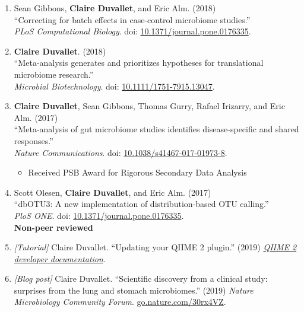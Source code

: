 \documentclass[10pt]{article}
\makeatletter
\newlength{\bibhang}
\newlength{\bibsep}
 {\@listi \global\bibsep\itemsep \global\advance\bibsep by\parsep}
\newenvironment{bibsection}%
        {\begin{enumerate}{}{%
       \setlength{\leftmargin}{\bibhang}%
       \setlength{\itemindent}{-\leftmargin}%
       \setlength{\itemsep}{\bibsep}%
       \setlength{\parsep}{\z@}%
        \setlength{\partopsep}{0pt}%
        \setlength{\topsep}{0pt}}}
        {\end{enumerate}\vspace{-.6\baselineskip}}
\makeatother
\begin{document}
\begin{bibsection}
	\item Sean Gibbons, \textbf{Claire Duvallet}, and Eric Alm.  (2018) \\ 
		``Correcting for batch effects in case-control microbiome studies.''  \\ 
		\emph{PLoS Computational Biology}. doi: \href{https://doi.org/10.1371/journal.pcbi.1006102}{10.1371/journal.pone.0176335}.
		
	\item \textbf{Claire Duvallet}. (2018) \\ 
		``Meta-analysis generates and prioritizes hypotheses for translational microbiome research.'' \\ 
		\emph{Microbial Biotechnology}. doi: \href{https://doi.org/10.1111/1751-7915.13047}{10.1111/1751-7915.13047}.
		
	\item \textbf{Claire Duvallet}, Sean Gibbons, Thomas Gurry, Rafael  Irizarry, and Eric Alm. (2017) \\ 
		``Meta-analysis of gut microbiome studies identifies disease-specific and shared responses.'' \\ 
		\emph{Nature Communications}. doi: \href{https://doi.org/10.1038/s41467-017-01973-8}{10.1038/s41467-017-01973-8}.
		
		\begin{itemize}
			\item Received PSB Award for Rigorous Secondary Data Analysis 
		\end{itemize}		
				
	\item Scott Olesen, \textbf{Claire Duvallet}, and Eric Alm. (2017) \\ 
		``dbOTU3: A new implementation of distribution-based OTU calling.'' \\ 
		\emph{PloS ONE}. doi: \href{https://doi.org/10.1371/journal.pone.0176335}{10.1371/journal.pone.0176335}. \\

\textbf{Non-peer reviewed}

	\item \textit{[Tutorial]} Claire Duvallet. ``Updating your QIIME 2 plugin.'' (2019) \href{https://dev.qiime2.org/latest/tutorials/updating-plugin/}{\emph{QIIME 2 developer documentation}}.

	\item \textit{[Blog post]} Claire Duvallet. ``Scientific discovery from a clinical study: surprises from the lung and stomach microbiomes.'' (2019) \emph{Nature Microbiology Community Forum}. \href{https://go.nature.com/30rx4VZ}{go.nature.com/30rx4VZ}.


\end{bibsection}
\end{document}
